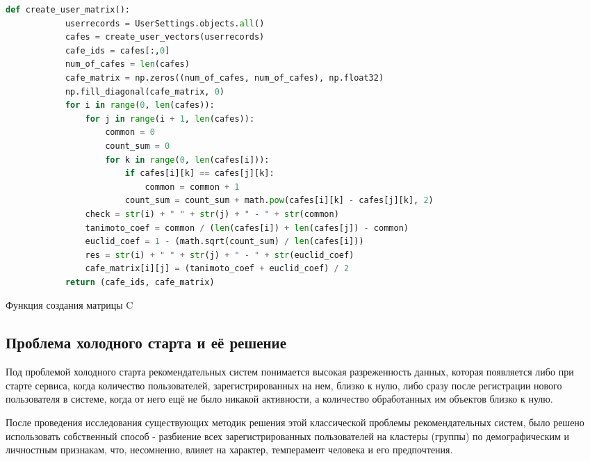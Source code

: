 \begin{ListingEnv}[H]
    \begin{lstlisting}[language=Python]
        def create_user_matrix():
            userrecords = UserSettings.objects.all()
            cafes = create_user_vectors(userrecords)
            cafe_ids = cafes[:,0]
            num_of_cafes = len(cafes)
            cafe_matrix = np.zeros((num_of_cafes, num_of_cafes), np.float32)
            np.fill_diagonal(cafe_matrix, 0)
            for i in range(0, len(cafes)):
                for j in range(i + 1, len(cafes)):
                    common = 0
                    count_sum = 0
                    for k in range(0, len(cafes[i])):
                        if cafes[i][k] == cafes[j][k]:
                            common = common + 1
                        count_sum = count_sum + math.pow(cafes[i][k] - cafes[j][k], 2)
                check = str(i) + " " + str(j) + " - " + str(common)
                tanimoto_coef = common / (len(cafes[i]) + len(cafes[j]) - common)
                euclid_coef = 1 - (math.sqrt(count_sum) / len(cafes[i]))
                res = str(i) + " " + str(j) + " - " + str(euclid_coef)
                cafe_matrix[i][j] = (tanimoto_coef + euclid_coef) / 2
            return (cafe_ids, cafe_matrix)
    \end{lstlisting}
    \caption{Функция создания матрицы C}
    \label{list:hwbeauty}
\end{ListingEnv}

\subsection{Проблема холодного старта и её решение}

Под проблемой холодного старта рекомендательных систем понимается высокая разреженность данных, которая появляется либо при старте сервиса, когда количество пользователей, зарегистрированных на нем, близко к нулю, либо сразу после регистрации нового пользователя в системе, когда от него ещё не было никакой активности, а количество обработанных им объектов близко к нулю.

После проведения исследования существующих методик решения этой классической проблемы рекомендательных систем, было решено использовать собственный способ - разбиение всех зарегистрированных пользователей на кластеры (группы) по демографическим и личностным признакам, что, несомненно, влияет на характер, темперамент человека и его предпочтения.

